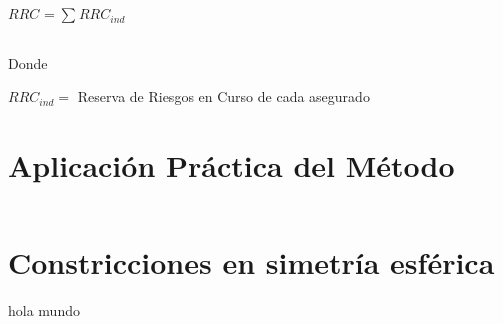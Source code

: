 \documentclass[11pt,twoside,openright,spanish]{report}
\numberwithin{equation}{chapter}
\numberwithin{figure}{chapter}
\numberwithin{table}{chapter}
\begin{document}
	
	{\centering
		$RRC_{}={\sum _{}^{}RRC_{ind}^{}}$
		
		\noindent
		
	}	
	
	
	 

$ $

 
	
	Donde
	
	 
	
		
	
	$RRC_{ind}^{}=$ Reserva de Riesgos en Curso de cada asegurado
	
	\chapter{Aplicación Práctica del Método}
	
	 

$ $

 

\clearpage
\appendix 

\fancyhead[LO]{}
\fancyhead[RE]{}
\pagestyle{fancy}

\chapter{Constricciones en simetría esférica}\label{desarrolloconstadm}

hola mundo
\end{document}
